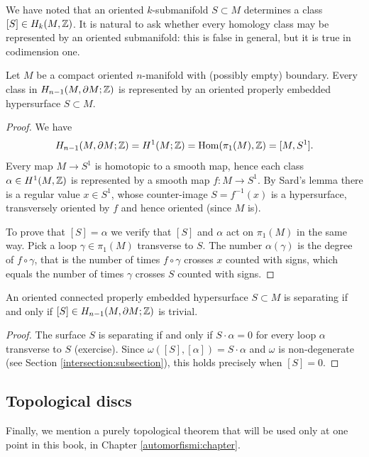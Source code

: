 We have noted that an oriented $k$-submanifold $S\subset M$ determines a class $[S]\in H_k(M,\mathbb{Z})$. It is natural to ask whether every homology class may be represented by an oriented submanifold: this is false in general, but it is true in codimension one.

\begin{prop} \label{homology:prop}
Let $M$ be a compact oriented $n$-manifold with (possibly empty) boundary. Every class in $H_{n-1}(M,\partial M;\mathbb{Z})$ is represented by an oriented properly embedded hypersurface $S\subset M$.
\end{prop}
\begin{proof}
We have
$$H_{n-1}(M,\partial M;\mathbb{Z}) = H^1(M;\mathbb{Z}) = {\rm Hom} (\pi_1(M), \mathbb{Z}) = [M, S^1].$$
Every map $M\to S^1$ is homotopic to a smooth map, hence each class $\alpha \in H^1(M,\mathbb{Z})$ is represented by a smooth map $f\colon M\to S^1$. By Sard's lemma there is a regular value $x\in S^1$, whose counter-image $S = f^{-1}(x)$ is a hypersurface, transversely oriented by $f$ and hence oriented (since $M$ is).

To prove that $[S] = \alpha$ we verify that $[S]$ and $\alpha$ act on $\pi_1(M)$ in the same way. Pick a loop $\gamma \in \pi_1(M)$ transverse to $S$. The number $\alpha(\gamma)$ is the degree of $f\circ\gamma$, that is the number of times $f\circ \gamma$ crosses $x$ counted with signs, which equals the number of times $\gamma$ crosses $S$ counted with signs.
\end{proof}

\begin{prop}
An oriented connected properly embedded hypersurface $S\subset M$ is separating if and only if $[S]\in H_{n-1}(M,\partial M; \mathbb{Z})$ is trivial.
\end{prop}
\begin{proof}
The surface $S$ is separating if and only if $S \cdot \alpha = 0$ for every loop $\alpha$ transverse to $S$ (exercise). Since $\omega([S], [\alpha]) = S \cdot \alpha$ and $\omega$ is non-degenerate (see Section \ref{intersection:subsection}), this holds precisely when $[S]=0$.
\end{proof}

\subsection{Topological discs}
Finally, we mention a purely topological theorem that will be used only at one point in this book, in Chapter \ref{automorfismi:chapter}.

